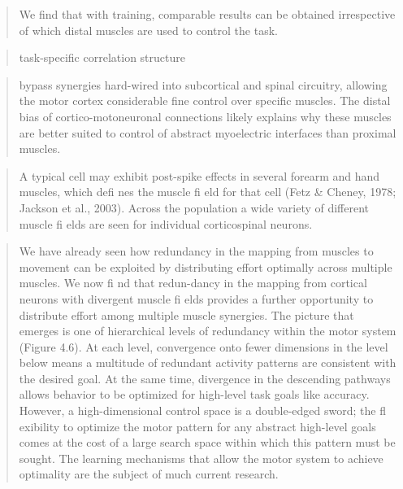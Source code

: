 \documentclass[../main.tex]{subfiles}
\begin{document}
\begin{quote}
We find that with training, comparable results can be obtained irrespective of which distal muscles are used to control the task.
\end{quote}

\begin{quote}
task-specific correlation structure
\end{quote}

\begin{quote}
\cite{CM connections} bypass synergies hard-wired into subcortical and spinal circuitry, allowing the motor cortex considerable fine control over specific muscles. The distal bias of cortico-motoneuronal connections likely explains why these muscles are better suited to control of abstract myoelectric interfaces than proximal muscles.
\end{quote}

\begin{quote}
A typical cell may exhibit post-spike effects in several forearm and hand muscles, which defi nes the muscle fi eld for that cell (Fetz \& Cheney, 1978; Jackson et al., 2003). Across the population a wide variety of different muscle fi elds are seen for individual corticospinal neurons.
\end{quote}

\begin{quote}
We have already seen how redundancy in the mapping from muscles to movement can be exploited by distributing effort optimally across multiple muscles. We now fi nd that redun-dancy in the mapping from cortical neurons with divergent muscle fi elds provides a further opportunity to distribute effort among multiple muscle synergies. The picture that emerges is one of hierarchical levels of redundancy within the motor system (Figure 4.6). At each level, convergence onto fewer dimensions in the level below means a multitude of redundant activity patterns are consistent with the desired goal. At the same time, divergence in the descending pathways allows behavior to be optimized for high-level task goals like accuracy. However, a high-dimensional control space is a double-edged sword; the fl exibility to optimize the motor pattern for any abstract high-level goals comes at the cost of a large search space within which this pattern must be sought. The learning mechanisms that allow the motor system to achieve optimality are the subject of much current research.
\end{quote}

\begin{quote}
\end{quote}
\end{document}
